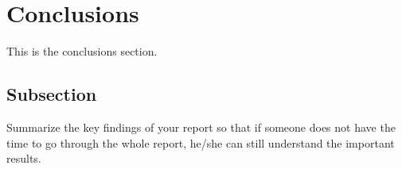 \section{Conclusions}\label{Section label}
This is the conclusions section.
\subsection{Subsection}\label{subsection}
Summarize the key findings of your report so that if someone does not have the time to go through the whole report, he/she can still understand the important results. 